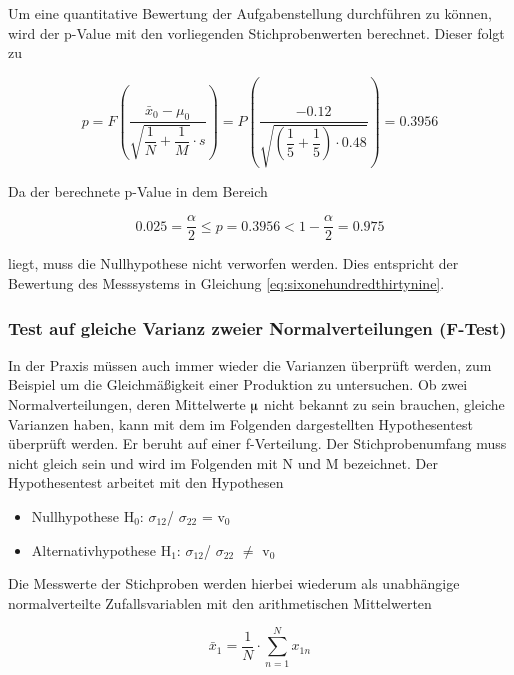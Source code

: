 \noindent Um eine quantitative Bewertung der Aufgabenstellung durchf\"{u}hren zu k\"{o}nnen, wird der p-Value mit den vorliegenden Stichprobenwerten berechnet. Dieser folgt zu

\begin{equation}\label{eq:sixonehundredfourty}
p=F\left(\dfrac{\bar{x}_{0} -\mu _{0} }{\sqrt{\dfrac{1}{N} +\dfrac{1}{M} } \cdot s} \right)=P\left(\dfrac{-0.12}{\sqrt{\left(\dfrac{1}{5} +\dfrac{1}{5} \right)\cdot 0.48}} \right)=0.3956
\end{equation}

\noindent Da der berechnete p-Value in dem Bereich

\begin{equation}\label{eq:sixonehundredfourtyone}
0.025=\dfrac{\alpha }{2} \le p=0.3956<1-\dfrac{\alpha }{2} =0.975
\end{equation}

\noindent liegt, muss die Nullhypothese nicht verworfen werden. Dies entspricht der Bewertung des Messsystems in Gleichung \eqref{eq:sixonehundredthirtynine}.

\subsubsection{Test auf gleiche Varianz zweier Normalverteilungen (F-Test)}

\noindent In der Praxis m\"{u}ssen auch immer wieder die Varianzen \"{u}berpr\"{u}ft werden, zum Beispiel um die Gleichm\"{a}{\ss}igkeit einer Produktion zu untersuchen. Ob zwei Normalverteilungen, deren Mittelwerte $\muup$ nicht bekannt zu sein brauchen, gleiche Varianzen haben, kann mit dem im Folgenden dargestellten Hypothesentest \"{u}berpr\"{u}ft werden. Er beruht auf einer f-Verteilung. Der Stichprobenumfang muss nicht gleich sein und wird im Folgenden mit N und M bezeichnet. Der Hypothesentest arbeitet mit den Hypothesen

\begin{itemize}
    \item Nullhypothese H$_{0}$: $\sigma_{12}$/ $\sigma_{22}$ = v$_{0}$
    \item  Alternativhypothese H$_{1}$: $\sigma_{12}$/ $\sigma_{22}$ $\neq$ v$_{0}$
\end{itemize}

\noindent Die Messwerte der Stichproben werden hierbei wiederum als unabh\"{a}ngige normalverteilte Zufallsvariablen mit den arithmetischen Mittelwerten

\begin{equation}\label{eq:sixonehundredfourtytwo}
\bar{x}_{1} =\dfrac{1}{N} \cdot \sum _{n=1}^{N}x_{1n}
\end{equation}

